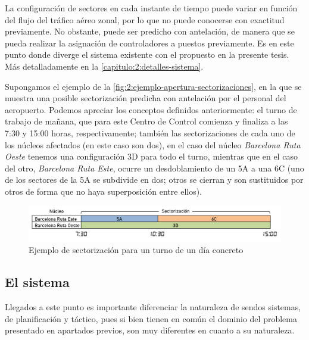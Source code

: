 La configuración de sectores en cada instante de tiempo puede variar en función del flujo del tráfico aéreo zonal, por lo que no puede conocerse con exactitud previamente. No obstante, puede ser predicho con antelación, de manera que se pueda realizar la asignación de controladores a puestos previamente.
Es en este punto donde diverge el sistema existente con el propuesto en la presente tesis. 
Más detalladamente en la \autoref{capitulo:2:detalles-sistema}.

Supongamos el ejemplo de la \autoref{fig:2:ejemplo-apertura-sectorizaciones}, en la que se muestra una posible sectorización predicha con antelación por el personal del aeropuerto. Podemos apreciar los conceptos definidos anteriormente: el turno de trabajo de mañana, que para este \gls{Centro de Control} comienza y finaliza a las 7:30 y 15:00 horas, respectivamente; también las sectorizaciones de cada uno de los núcleos afectados (en este caso son dos), en el caso del núcleo \textit{Barcelona Ruta Oeste} tenemos una configuración 3D para todo el turno, mientras que en el caso del otro, \textit{Barcelona Ruta Este}, ocurre un desdoblamiento de un 5A a una 6C (uno de los sectores de la 5A se subdivide en dos; otros se cierran y son sustituidos por otros de forma que no haya superposición entre ellos).

\begin{figure}[htbp]
	\centering
	\includegraphics[width=\linewidth]{ejemplo-apertura-sectorizaciones}
	\caption{Ejemplo de sectorización para un turno de un día concreto}
	\label{fig:2:ejemplo-apertura-sectorizaciones}
\end{figure}

\subsection{El sistema \legacy{}}
\label{capitulo:2:detalles-sistema}
Llegados a este punto es importante diferenciar la naturaleza de sendos sistemas, de planificación y táctico, pues si bien tienen en común el dominio del problema presentado en apartados previos, son muy diferentes en cuanto a su naturaleza.

